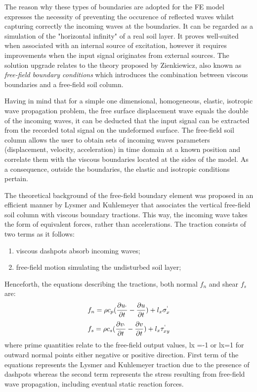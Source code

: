 \documentclass[10pt,a4paper]{report}
\begin{document}
	The reason why these types of boundaries are adopted for the FE model expresses the necessity of preventing the occurence of reflected waves whilst capturing correctly the incoming waves at the boundaries. It can be regarded as a simulation of the "horizontal infinity" of a real soil layer. It proves well-suited when associated with an internal source of excitation, however it requires improvements when the input signal originates from external sources. The solution upgrade relates to the theory proposed by Zienkiewicz, also known as \textit{free-field boundary conditions} which introduces the combination between viscous boundaries and a free-field soil column.
	
	Having in mind that for a simple one dimensional, homogeneous, elastic, isotropic wave propagation problem, the free surface displacement wave equals the double of the incoming waves, it can be deducted that the input signal can be extracted from the recorded total signal on the undeformed surface. The free-field soil column allows the user to obtain sets of incoming waves parameters (displacement, velocity, acceleration) in time domain at a known position and correlate them with the viscous boundaries located at the sides of the model. As a consequence, outside the boundaries, the elastic and isotropic conditions pertain.
	 
	The theoretical background of the free-field boundary element was proposed in an efficient manner by Lysmer and Kuhlemeyer that associates the vertical free-field soil column with viscous boundary tractions. This way, the incoming wave takes the form of equivalent forces, rather than accelerations. The traction consists of two terms as it follows:
	\begin{enumerate}
		\item viscous dashpots absorb incoming waves;
		\item free-field motion simulating the undisturbed soil layer;
	\end{enumerate}
Henceforth, the equations describing the tractions, both normal $f_n$ and shear $f_s$ are:
\begin{equation}
	f_n=\rho c_p (\frac{\partial u_`}{\partial t}-\frac{\partial u}{\partial t})+l_x \sigma^`_x
\end{equation}
\begin{equation}
f_s=\rho c_s (\frac{\partial v_`}{\partial t}-\frac{\partial v}{\partial t})+l_x \tau^`_{xy}
\end{equation}
where prime quantities relate to the free-field output values, lx =-1 or lx=1 for outward normal points either negative or positive direction. First term of the equations represents the Lysmer and Kuhlemeyer traction due to the presence of dashpots whereas the second term represents the stress resulting from free-field wave propagation, including eventual static reaction forces.
\end{document}
